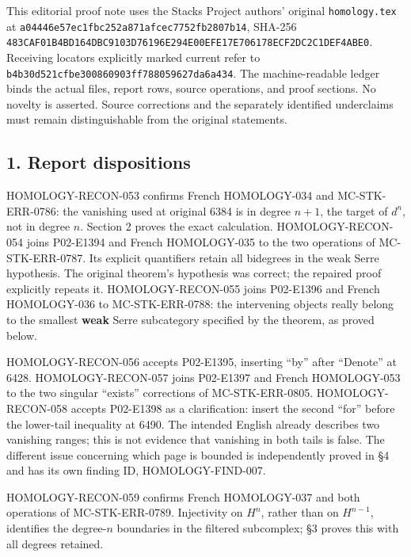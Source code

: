 \documentclass[11pt]{article}
\begin{document}
This editorial proof note uses the Stacks Project authors' original \texttt{homology.tex} at \texttt{a04446e5\allowbreak{}7ec1fbc2\allowbreak{}52a871af\allowbreak{}cec7752f\allowbreak{}b2807b14}, SHA-256 \texttt{483CAF01\allowbreak{}B4BD164D\allowbreak{}BC9103D7\allowbreak{}6196E294\allowbreak{}E00EFE17\allowbreak{}E706178E\allowbreak{}CF2DC2C1\allowbreak{}DEF4ABE0}. Receiving locators explicitly marked current refer to \texttt{b4b30d52\allowbreak{}1cfbe300\allowbreak{}860903ff\allowbreak{}78805962\allowbreak{}7da6a434}. The machine-readable ledger binds the actual files, report rows, source operations, and proof sections. No novelty is asserted. Source corrections and the separately identified underclaims must remain distinguishable from the original statements.

\subsection{1. Report dispositions}\label{note-07-report-dispositions}

HOMOLOGY-RECON-053 confirms French HOMOLOGY-034 and MC-STK-ERR-0786: the vanishing used at original 6384 is in degree \(n+1\), the target of \(d^n\), not in degree \(n\). Section 2 proves the exact calculation. HOMOLOGY-RECON-054 joins P02-E1394 and French HOMOLOGY-035 to the two operations of MC-STK-ERR-0787. Its explicit quantifiers retain all bidegrees in the weak Serre hypothesis. The original theorem's hypothesis was correct; the repaired proof explicitly repeats it. HOMOLOGY-RECON-055 joins P02-E1396 and French HOMOLOGY-036 to MC-STK-ERR-0788: the intervening objects really belong to the smallest \textbf{weak} Serre subcategory specified by the theorem, as proved below.

HOMOLOGY-RECON-056 accepts P02-E1395, inserting ``by'' after ``Denote'' at 6428. HOMOLOGY-RECON-057 joins P02-E1397 and French HOMOLOGY-053 to the two singular ``exists'' corrections of MC-STK-ERR-0805. HOMOLOGY-RECON-058 accepts P02-E1398 as a clarification: insert the second ``for'' before the lower-tail inequality at 6490. The intended English already describes two vanishing ranges; this is not evidence that vanishing in both tails is false. The different issue concerning which page is bounded is independently proved in §4 and has its own finding ID, HOMOLOGY-FIND-007.

HOMOLOGY-RECON-059 confirms French HOMOLOGY-037 and both operations of MC-STK-ERR-0789. Injectivity on \(H^n\), rather than on \(H^{n-1}\), identifies the degree-\(n\) boundaries in the filtered subcomplex; §3 proves this with all degrees retained.
\end{document}
